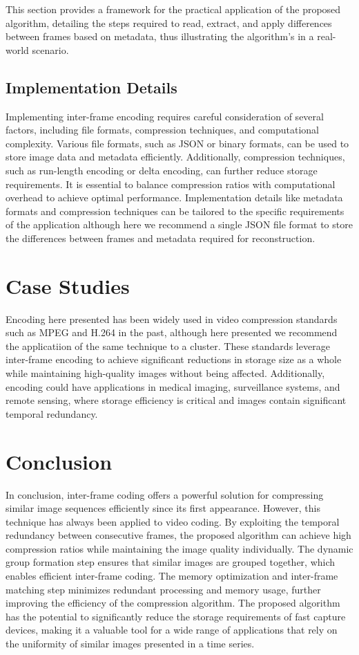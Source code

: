 \documentclass[twocolumn]{article}
\begin{document}
This section provides a framework for the practical application of the proposed algorithm, detailing the steps required to read, extract, and apply differences between frames based on metadata, thus illustrating the algorithm's in a real-world scenario.

\subsection{Implementation Details}
Implementing inter-frame encoding requires careful consideration of several factors, including file formats, compression techniques, and computational complexity. Various file formats, such as JSON or binary formats, can be used to store image data and metadata efficiently. Additionally, compression techniques, such as run-length encoding or delta encoding, can further reduce storage requirements. It is essential to balance compression ratios with computational overhead to achieve optimal performance. Implementation details like metadata formats and compression techniques can be tailored to the specific requirements of the application although here we recommend a single JSON file format to store the differences between frames and metadata required for reconstruction.

\section{Case Studies}
Encoding here presented has been widely used in video compression standards such as MPEG and H.264 \cite{wiegand2003overview} in the past, although here presented we recommend the applicatiion of the same technique to a cluster. These standards leverage inter-frame encoding to achieve significant reductions in storage size as a whole while maintaining high-quality images without being affected. Additionally, encoding could have applications in medical imaging, surveillance systems, and remote sensing, where storage efficiency is critical and images contain significant temporal redundancy.

\section{Conclusion}
In conclusion, inter-frame coding offers a powerful solution for compressing similar image sequences efficiently since its first appearance. However, this technique has always been applied to video coding. By exploiting the temporal redundancy between consecutive frames, the proposed algorithm can achieve high compression ratios while maintaining the image quality individually. The dynamic group formation step ensures that similar images are grouped together, which enables efficient inter-frame coding. The memory optimization and inter-frame matching step minimizes redundant processing and memory usage, further improving the efficiency of the compression algorithm. The proposed algorithm has the potential to significantly reduce the storage requirements of fast capture devices, making it a valuable tool for a wide range of applications that rely on the uniformity of similar images presented in a time series.
\end{document}
